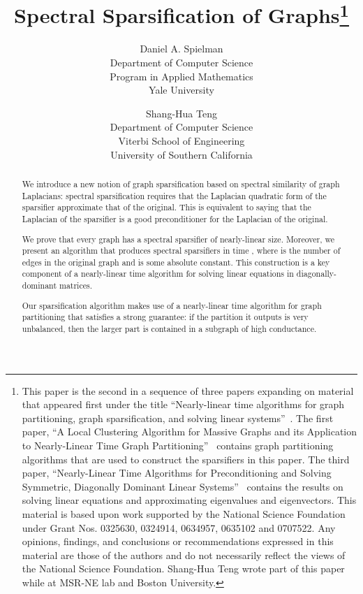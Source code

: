 \documentclass[11pt]{article}
\begin{document}
\title{Spectral Sparsification of Graphs\thanks{
This paper is the second in a sequence of three papers expanding
  on material that appeared first under the title
  ``Nearly-linear time algorithms for graph partitioning, 
    graph sparsification, and solving linear systems''~\cite{SpielmanTengPrecon}.
The first paper,
``A Local Clustering Algorithm for Massive Graphs and its Application to Nearly-Linear Time Graph Partitioning''~\cite{SpielmanTengCuts}
 contains graph partitioning algorithms that are used to construct the sparsifiers in this paper.
The third paper, ``Nearly-Linear Time Algorithms for Preconditioning and Solving Symmetric, Diagonally Dominant Linear Systems''~\cite{SpielmanTengLinsolve} contains the results
  on solving linear equations and approximating eigenvalues and eigenvectors.
\vskip 0.01in
This material is based upon work supported by the National Science Foundation 
  under Grant Nos. 0325630, 0324914, 0634957, 0635102 and 0707522.
Any opinions, findings, and conclusions or recommendations expressed in this material are those of the authors and do not necessarily reflect the views of the National Science Foundation.
\vskip 0.01in
Shang-Hua Teng wrote part of this paper while at MSR-NE lab and Boston
University.}
}

\author{
Daniel A. Spielman\\
Department of Computer Science\\
Program in Applied Mathematics\\
Yale University
\and
Shang-Hua Teng\\
Department of Computer Science\\
Viterbi School of Engineering\\
University of Southern California}

\maketitle

\begin{abstract}
We introduce a new notion of graph sparsification based on 
  spectral similarity of graph Laplacians:
 spectral sparsification requires that the Laplacian quadratic form
  of the sparsifier approximate that
  of the original.
This is equivalent to saying that the Laplacian of the sparsifier
  is a good preconditioner for the Laplacian of the original.

We prove that every graph has a spectral sparsifier of nearly-linear size.
Moreover, we present an algorithm that produces spectral sparsifiers
   in time , where  is the number of edges in the
   original graph and  is some absolute constant.
This construction is a key component of a nearly-linear time algorithm
  for solving linear equations in diagonally-dominant matrices.

Our sparsification algorithm makes use of a nearly-linear time algorithm for graph
  partitioning that satisfies a strong guarantee:
 if the partition it outputs is very unbalanced, then the larger part is contained in
  a subgraph of high conductance.
\end{abstract}
\end{document}
